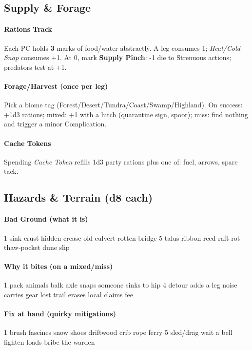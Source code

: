 \subsection*{Supply \& Forage}

\paragraph{Rations Track}
Each PC holds \textbf{3} marks of food/water abstractly. A leg consumes 1; \emph{Heat/Cold Snap} consumes +1.  
At 0, mark \textbf{Supply Pinch}: -1 die to Strenuous actions; predators test at +1.

\paragraph{Forage/Harvest (once per leg)}
Pick a biome tag (Forest/Desert/Tundra/Coast/Swamp/Highland). On success: +1d3 rations; mixed: +1 with a hitch (quarantine sign, spoor); miss: find nothing and trigger a minor Complication.

\paragraph{Cache Tokens}
Spending \emph{Cache Token} refills 1d3 party rations plus one of: fuel, arrows, spare tack.
\subsection*{Hazards \& Terrain (d8 each)}

\paragraph{Bad Ground (what it is)}
1 sink crust  hidden crease  old culvert  rotten bridge  
5 talus ribbon  reed-raft rot  thaw-pocket  dune slip

\paragraph{Why it bites (on a mixed/miss)}
1 pack animals balk  axle snaps  someone sinks to hip  
4 detour adds a leg  noise carries  gear lost  trail erases  local claims fee

\paragraph{Fix at hand (quirky mitigations)}
1 brush fascines  snow shoes  driftwood crib  rope ferry  
5 sled/drag  wait a bell  lighten loads  bribe the warden
